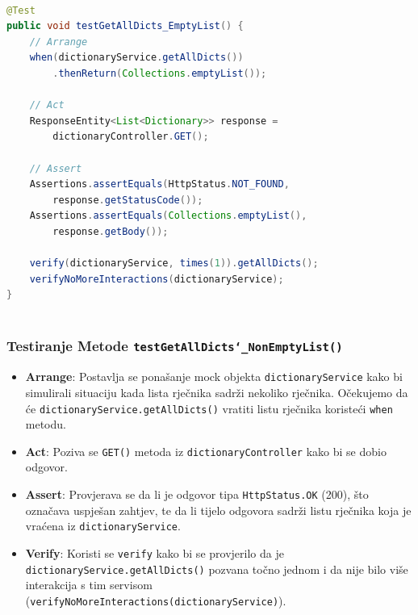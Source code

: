 			\begin{lstlisting}[language=Java]
				
@Test
public void testGetAllDicts_EmptyList() {
	// Arrange
	when(dictionaryService.getAllDicts())
		.thenReturn(Collections.emptyList());
	
	// Act
	ResponseEntity<List<Dictionary>> response = 
		dictionaryController.GET();
	
	// Assert
	Assertions.assertEquals(HttpStatus.NOT_FOUND, 
		response.getStatusCode());
	Assertions.assertEquals(Collections.emptyList(), 
		response.getBody());
	
	verify(dictionaryService, times(1)).getAllDicts();
	verifyNoMoreInteractions(dictionaryService);
}
				
			\end{lstlisting}
			
			\subsubsection{Testiranje Metode \texttt{testGetAllDicts\char`_NonEmptyList()}}	
			
			\begin{itemize}
				\item \textbf{Arrange}: Postavlja se ponašanje mock objekta \texttt{dictionaryService} kako bi simulirali situaciju kada lista rječnika sadrži nekoliko rječnika. Očekujemo da će \texttt{dictionaryService.getAllDicts()} vratiti listu rječnika koristeći \texttt{when} metodu.
				
				\item \textbf{Act}: Poziva se \texttt{GET()} metoda iz \texttt{dictionaryController} kako bi se dobio odgovor.
				
				\item \textbf{Assert}: Provjerava se da li je odgovor tipa \texttt{HttpStatus.OK} (200), što označava uspješan zahtjev, te da li tijelo odgovora sadrži listu rječnika koja je vraćena iz \texttt{dictionaryService}.
				
				\item \textbf{Verify}: Koristi se \texttt{verify} kako bi se provjerilo da je \texttt{dictionaryService.getAllDicts()} pozvana točno jednom i da nije bilo više interakcija s tim servisom (\texttt{verifyNoMoreInteractions(dictionaryService)}).
			\end{itemize}
			

